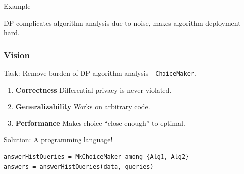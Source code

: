 \documentclass{beamer}
\begin{document}
\begin{frame}{Example}
\begin{center}
\end{center}
DP complicates algorithm analysis due to noise, makes algorithm deployment hard.
\end{frame}
\begin{frame}[fragile]\frametitle{Vision}
Task: Remove burden of DP algorithm analysis---\texttt{ChoiceMaker}.
\begin{enumerate}
\item \textbf{Correctness} Differential privacy is never violated. 
\item \textbf{Generalizability} Works on arbitrary code.
\item \textbf{Performance} Makes choice ``close enough'' to optimal.
\end{enumerate}
Solution: A programming language!
\begin{lstlisting}[style=MyPythonStyle]
answerHistQueries = MkChoiceMaker among {Alg1, Alg2}
answers = answerHistQueries(data, queries)
\end{lstlisting}
\end{frame}
\end{document}
